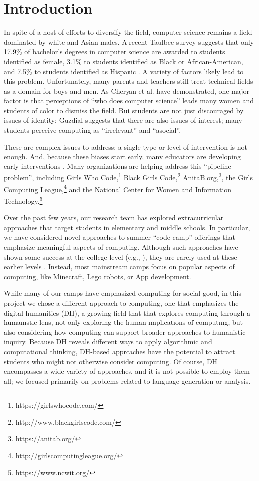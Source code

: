 \section{Introduction}

In spite of a host of efforts to diversify the field, computer
science remains a field dominated by white and Asian males.  A
recent Taulbee survey \cite{Taulbee2016} suggests that only 17.9\%
of bachelor's degrees in computer science are awarded to students
identified as female, 3.1\% to students identified as Black or
African-American, and 7.5\% to students identified as Hispanic
\cite{Taulbee2016}.  A variety of factors likely lead to this
problem.  Unfortunately, many parents and teachers still treat
technical fields as a domain for boys and men.  As Cheryan et al.
\cite{Cheryan2010} have demonstrated, one major factor is that
perceptions of ``who does computer science'' leads many women and
students of color to dismiss the field.  But students are not
just discouraged by issues of identity; Guzdial \cite{Guzdial2009}
suggests that there are also issues of interest; many students
perceive computing as ``irrelevant'' and ``asocial''.

These are complex issues to address; a single type or level of
intervention is not enough.  And, because these biases start early,
many educators are developing early interventions
\cite{McGill2015,Decker2016}.  Many organizations are helping address
this ``pipeline problem'', including Girls Who
Code,\footnote{https://girlswhocode.com/} Black Girls
Code,\footnote{http://www.blackgirlscode.com/}
AnitaB.org,\footnote{https://anitab.org/}, the Girls Computing
League,\footnote{http://girlscomputingleague.org/} and the National
Center for Women and Information
Technology.\footnote{https://www.ncwit.org/}

Over the past few years, our research team has explored extracurricular
approaches that target students in elementary and middle schools.
In particular, we have considered novel approaches to summer ``code
camp'' offerings that emphasize meaningful aspects of computing.
Although such approaches have shown some success at the college
level (e.g., \cite{Goldweber2013, Goldweber2018}), they are rarely
used at these earlier levels \cite{DeWitt2017}.  Instead, most
mainstream camps focus on popular aspects of computing, like
Minecraft, Lego robots, or App development.

While many of our camps have emphasized computing for social good,
in this project we chose a different approach to computing, one
that emphasizes the digital humanities (DH), a growing field that
that explores computing through a humanistic lens, not only exploring
the human implications of computing, but also considering how
computing can support broader approaches to humanistic inquiry.
Because DH reveals different ways to apply algorithmic and computational
thinking, DH-based approaches have the potential to attract students
who might not otherwise consider computing.  Of course, DH encompasses
a wide variety of approaches, and it is not possible to employ them
all; we focused primarily on problems related to language generation
or analysis.

